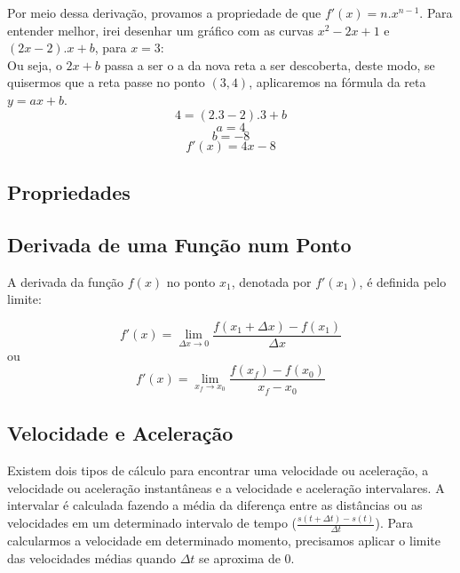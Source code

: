 \documentclass[ ]{article}
\begin{document}
	Por meio dessa derivação, provamos a propriedade de que $f'(x) = n.x^{n-1}$.
	\newpage
	Para entender melhor, irei desenhar um gráfico com as curvas $x^2-2x+1$ e $(2x-2).x+b$, para $x=3$:\\
	Ou seja, o $2x+b$ passa a ser o a da nova reta a ser descoberta, deste modo, se quisermos que a reta passe no ponto $(3,4)$, aplicaremos na fórmula da reta $y = ax+b$.
	$$4 = (2.3-2).3 + b$$
	$$a = 4$$ $$b=-8$$
	$$f'(x) = 4x - 8$$
	
	
	\subsection{Propriedades}
	
	\subsection{Derivada de uma Função num Ponto}
		A derivada da função $f(x)$ no ponto $x_1$, denotada por $f'(x_1)$, é definida pelo limite:
		
		$$f'(x) = \lim_{\Delta x\to 0} \dfrac{f(x_1+\Delta x)-f(x_1)}{\Delta x}$$
		ou
		$$f'(x) = \lim_{x_f\to x_0}\dfrac{f(x_f)-f(x_0)}{x_f-x_0}$$	
		
	\subsection{Velocidade e Aceleração}
		Existem dois tipos de cálculo para encontrar uma velocidade ou aceleração, a velocidade ou aceleração instantâneas e a velocidade e aceleração intervalares. A intervalar é calculada fazendo a média da diferença entre as distâncias ou as velocidades em um determinado intervalo de tempo ($\frac{s(t+\Delta t)-s(t)}{\Delta t}$). Para calcularmos a velocidade em determinado momento, precisamos aplicar o limite das velocidades médias quando $\Delta t$ se aproxima de 0.
		
\end{document}
